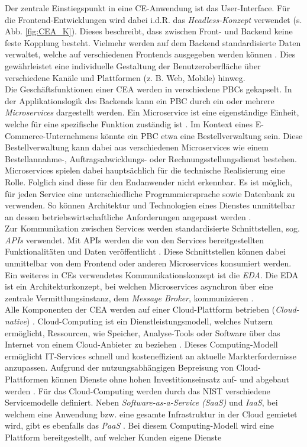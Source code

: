 Der zentrale Einstiegspunkt in eine CE-Anwendung ist das User-Interface. Für die Frontend-Entwicklungen wird dabei i.d.R. das \textit{Headless-Konzept} verwendet (s. Abb. \ref{fig:CEA_K}). Dieses beschreibt, dass zwischen Front- und Backend keine feste Kopplung besteht. Vielmehr werden auf dem Backend standardisierte Daten verwaltet, welche auf verschiedenen Frontends ausgegeben werden können \cite[4]{Attardi.2020b}. Dies gewährleistet eine individuelle Gestaltung der Benutzeroberfläche über verschiedene Kanäle und Plattformen (z. B. Web, Mobile) hinweg.\\ Die Geschäftsfunktionen einer CEA werden in verschiedene PBCs gekapselt. In der Applikationslogik des Backends kann ein PBC durch ein oder mehrere \textit{Microservices} dargestellt werden. Ein Microservice ist eine eigenständige Einheit, welche für eine spezifische Funktion zuständig ist \cite[S. 93 ff.]{Lauretis.1027201910302019}. Im Kontext eines E-Commerce-Unternehmens könnte ein PBC etwa eine Bestellverwaltung sein. Diese Bestellverwaltung kann dabei aus verschiedenen Microservices wie einem Bestellannahme-, Auftragsabwicklungs- oder Rechnungsstellungsdienst bestehen. Microservices spielen dabei hauptsächlich für die technische Realisierung eine Rolle. Folglich sind diese für den Endanwender nicht erkennbar. Es ist möglich, für jeden Service eine unterschiedliche Programmiersprache sowie Datenbank zu verwenden. So können Architektur und Technologien eines Dienstes unmittelbar an dessen betriebswirtschaftliche Anforderungen angepasst werden \cite[42]{Balalaie.2016}.\\ Zur Kommunikation zwischen Services werden standardisierte Schnittstellen, sog. \textit{\ac*{APIs}} verwendet. Mit APIs werden die von den Services bereitgestellten Funktionalitäten und Daten veröffentlicht \cite[15]{Biehl.2015}. Diese Schnittstellen können dabei unmittelbar von dem Frontend oder anderen Microservices konsumiert werden. Ein weiteres in CEs verwendetes Kommunikationskonzept ist die \textit{\ac{EDA}}. Die EDA ist ein Architekturkonzept, bei welchen Microservices asynchron über eine zentrale Vermittlungsinstanz, dem \textit{Message Broker}, kommunizieren \cite[54]{Bruns.2010}.\\ Alle Komponenten der CEA werden auf einer Cloud-Plattform betrieben (\textit{Cloud-native}) \cite[3]{Kratzke.2017}. Cloud-Computing ist ein Dienstleistungsmodell, welches Nutzern ermöglicht, Ressourcen, wie Speicher, Analyse-Tools oder Software über das Internet von einem Cloud-Anbieter zu beziehen \cite[5]{Reinheimer.2018}. Dieses Computing-Modell ermöglicht IT-Services schnell und kosteneffizient an aktuelle Markterfordernisse anzupassen. Aufgrund der nutzungsabhängigen Bepreisung von Cloud-Plattformen können Dienste ohne hohen Investitionseinsatz auf- und abgebaut werden \cite[10]{Reinheimer.2018}. Für das Cloud-Computing werden durch das \ac{NIST} verschiedene Servicemodelle definiert. Neben \textit{Software-as-a-Ser\-vice (\acs{SaaS})} und \textit{\ac{IaaS}}, bei welchem eine Anwendung bzw. eine gesamte Infrastruktur in der Cloud gemietet wird, gibt es ebenfalls das \textit{\ac{PaaS}} \cite{Reinheimer.2018} \cite[9]{Reinheimer.2018}. Bei diesem Computing-Modell wird eine Plattform bereitgestellt, auf welcher Kunden eigene Dienste 